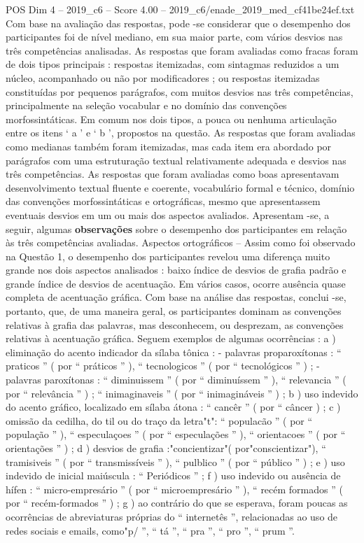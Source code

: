 \begin{textsample}{POS Dim 4 – 2019\_c6 – Score 4.00 – 2019\_c6/enade\_2019\_med\_cf41be24ef.txt}
Com base na avaliação das respostas, pode -se considerar que o desempenho dos participantes foi de nível mediano, em sua maior parte, com vários desvios nas três competências analisadas.
As respostas que foram avaliadas como fracas foram de dois tipos principais : respostas itemizadas, com sintagmas reduzidos a um núcleo, acompanhado ou não por modificadores ; ou respostas itemizadas constituídas por pequenos parágrafos, com muitos desvios nas três competências, principalmente na seleção vocabular e no domínio das convenções morfossintáticas.
Em comum nos dois tipos, a pouca ou nenhuma articulação entre os itens ‘ a ’ e ‘ b ’, propostos na questão.
As respostas que foram avaliadas como medianas também foram itemizadas, mas cada item era abordado por parágrafos com uma estruturação textual relativamente adequada e desvios nas três competências.
As respostas que foram avaliadas como boas apresentavam desenvolvimento textual fluente e coerente, vocabulário formal e técnico, domínio das convenções morfossintáticas e ortográficas, mesmo que apresentassem eventuais desvios em um ou mais dos aspectos avaliados.
Apresentam -se, a seguir, algumas \textbf{observações} sobre o desempenho dos participantes em relação às três competências avaliadas.
Aspectos ortográficos – Assim como foi observado na Questão 1, o desempenho dos participantes revelou uma diferença muito grande nos dois aspectos analisados : baixo índice de desvios de grafia padrão e grande índice de desvios de acentuação.
Em vários casos, ocorre ausência quase completa de acentuação gráfica.
Com base na análise das respostas, conclui -se, portanto, que, de uma maneira geral, os participantes dominam as convenções relativas à grafia das palavras, mas desconhecem, ou desprezam, as convenções relativas à acentuação gráfica.
Seguem exemplos de algumas ocorrências : a ) eliminação do acento indicador da sílaba tônica : - palavras proparoxítonas : “ praticos ” ( por “ práticos ” ), “ tecnologicos ” ( por “ tecnológicos ” ) ; - palavras paroxítonas : “ diminuissem ” ( por “ diminuíssem ” ), “ relevancia ” ( por “ relevância ” ) ; “ inimaginaveis ” ( por “ inimagináveis ” ) ; b ) uso indevido do acento gráfico, localizado em sílaba átona : “ cancêr ” ( por “ câncer ) ; c ) omissão da cedilha, do til ou do traço da letra"t": “ populacão ” ( por “ população ” ), “ especulaçoes ” ( por “ especulações ” ), “ orientacoes ” ( por “ orientações ” ) ; d ) desvios de grafia :"concientizar"( por"conscientizar"), “ tramisiveis ” ( por “ transmissíveis ” ), “ pulblico ” ( por “ público ” ) ; e ) uso indevido de inicial maiúscula : “ Periódicos ” ; f ) uso indevido ou ausência de hífen : “ micro-empresário ” ( por “ microempresário ” ), “ recém formados ” ( por “ recém-formados ” ) ; g ) ao contrário do que se esperava, foram poucas as ocorrências de abreviaturas próprias do “ internetês ”, relacionadas ao uso de redes sociais e emails, como"p/ ”, “ tá ”, “ pra ”, “ pro ”, “ prum ”.

\end{textsample}
